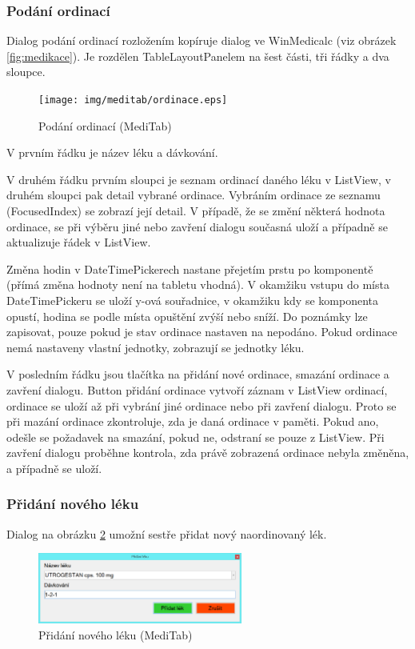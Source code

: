 \subsubsection{Podání ordinací}
\label{sec:ordinace}

Dialog podání ordinací rozložením kopíruje dialog ve WinMedicalc (viz obrázek \ref{fig:medikace}). Je rozdělen TableLayoutPanelem na šest části, tři řádky a dva sloupce.

\begin{figure}[H]
	\centering
	\texttt{[image: img/meditab/ordinace.eps]}
	\caption{Podání ordinací (MediTab)}
  \label{fig:ordinace}
\end{figure}

V prvním řádku je název léku a dávkování.

V druhém řádku prvním sloupci je seznam ordinací daného léku v ListView, v druhém sloupci pak detail vybrané ordinace. Vybráním ordinace ze seznamu (FocusedIndex) se zobrazí její detail. V případě, že se změní některá hodnota ordinace, se při výběru jiné nebo zavření dialogu současná uloží a případně se aktualizuje řádek v ListView.

Změna hodin v DateTimePickerech nastane přejetím prstu po komponentě (přímá změna hodnoty není na tabletu vhodná). V okamžiku vstupu do místa DateTimePickeru se uloží y-ová souřadnice, v okamžiku kdy se komponenta opustí, hodina se podle místa opuštění zvýší nebo sníží. Do poznámky lze zapisovat, pouze pokud je stav ordinace nastaven na nepodáno. Pokud ordinace nemá nastaveny vlastní jednotky, zobrazují se jednotky léku.

V posledním řádku jsou tlačítka na přidání nové ordinace, smazání ordinace a zavření dialogu. Button přidání ordinace vytvoří záznam v ListView ordinací, ordinace se uloží až při vybrání jiné ordinace nebo při zavření dialogu. Proto se při mazání ordinace zkontroluje, zda je daná ordinace v paměti. Pokud ano, odešle se požadavek na smazání, pokud ne, odstraní se pouze z ListView. Při zavření dialogu proběhne kontrola, zda právě zobrazená ordinace nebyla změněna, a případně se uloží.


\subsubsection{Přidání nového léku}
\label{sec:pridat_lek}

Dialog na obrázku \ref{fig:medikace_pridat_lek} umožní sestře přidat nový naordinovaný lék.

\begin{figure}[H]
	\centering
	\includegraphics[width=0.6\textwidth]{img/meditab/medikace_pridat_lek.eps}
	\caption{Přidání nového léku (MediTab)}
  \label{fig:medikace_pridat_lek}
\end{figure}

